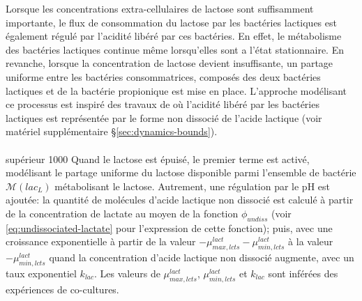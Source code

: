 \documentclass[../main.tex]{subfiles}
\begin{document}
Lorsque les concentrations extra-cellulaires de lactose sont suffisamment importante, le flux de consommation du lactose par les bactéries lactiques est également régulé par l'acidité libéré par ces bactéries. En effet, le métabolisme des bactéries lactiques continue même lorsqu'elles sont a l'état stationnaire. En revanche, lorsque la concentration de lactose devient insuffisante, un partage uniforme entre les bactéries consommatrices, composés des deux bactéries lactiques et de la bactérie propionique est mise en place. L'approche modélisant ce processus est inspiré des travaux de \citep{Ozcan.2020} où l'acidité libéré par les bactéries lactiques est représentée par le forme non dissocié de l'acide lactique (voir matériel supplémentaire \S\ref{sec:dynamics-bounds}).

\paragraph*{\lactis}
\begin{itemize}
{supérieur}
{1000}{
Quand le lactose est épuisé, le premier terme est activé, modélisant le partage uniforme du lactose disponible parmi l'ensemble de bactérie $\mathcal{M}(lac_L)$ métabolisant le lactose. Autrement, une régulation par le pH est ajoutée: la quantité de molécules d'acide lactique non dissocié est calculé à partir de la concentration de lactate au moyen de la fonction $\phi_{undiss}$ (voir \eqref{eq:undissociated-lactate} pour l'expression de cette fonction); puis, avec une croissance exponentielle à partir de la valeur $-\mu^{lact}_{max,lcts}-\mu^{lact}_{min,lcts}$ à la valeur $-\mu^{lact}_{min,lcts}$ quand la concentration d'acide lactique non dissocié augmente, avec un taux exponentiel $k_{lac}$. Les valeurs de $\mu^{lact}_{max,lcts}$, $\mu^{lact}_{min,lcts}$ et $k_{lac}$ sont inférées des expériences de co-cultures.
}

\end{itemize}
\end{document}
